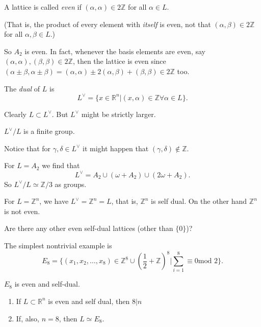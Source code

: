 \begin{definition}
\label{definition-even-lattice}
A lattice is called {\it even} if $(\alpha,\alpha)\in 2 \mathbb{Z}$ 
for all $\alpha \in L$.
\end{definition}

\noindent
(That is, the product of every element with {\it itself} is even,
not that $(\alpha,\beta)\in 2 \mathbb{Z}$ for all $\alpha,\beta \in L$.)

So $A_2$ is even. In fact, whenever the basis elements
are even, say $(\alpha,\alpha),(\beta,\beta)\in 2\mathbb{Z}$,
then the lattice is even since
$(\alpha \pm \beta,\alpha \pm \beta)=(\alpha,\alpha)
\pm 2(\alpha,\beta)+(\beta,\beta) \in 2\mathbb{Z}$ too.

\begin{definition}
\label{definition-dual-lattice}
The {\it dual} of $L$ is 
$$
L^\vee=\{ x \in \mathbb{R}^n|(x,\alpha) \in \mathbb{Z}\forall \alpha \in L\}.
$$
\end{definition}

\noindent
Clearly $L \subset L^\vee$.
But $L^\vee$ might be strictly larger.

\begin{exercise}
\label{exercise-discriminant}
$L^\vee/L$ is a finite group.
\end{exercise}

\noindent
Notice that for  $\gamma,\delta \in L^\vee$
it might happen that $(\gamma,\delta) \not\in \mathbb{Z}$.

For $L=A_2$ we find that
$$
L^\vee = A_2 \cup (\omega+A_2) \cup  (2\omega + A_2).
$$
So $L^\vee/L \simeq \mathbb{Z}/3$ as groups.

For $L = \mathbb{Z}^n$, we have $L^\vee=\mathbb{Z}^n=L$, that is,
$\mathbb{Z}^n$ is self dual.
On the other hand $\mathbb{Z}^n$ is not even.

Are there any other even self-dual lattices
(other than $\{0\}$)?

The simplest nontrivial example is
$$
E_8=\{(x_1,x_2,\ldots,x_8) \in \mathbb{Z}^8 \cup (\frac{1}{2}+\mathbb{Z})^8|
\sum_{i=1}^8 \equiv 0 \text{mod }2\}.
$$

\begin{lemma}
\label{lemma-e8}
$E_8$ is even and self-dual.
\end{lemma}

\begin{theorem}
\label{theorem-self-dual-lattices}
\begin{enumerate}
\item If $L \subset \mathbb{R}^n$ is even and self dual,
then $8|n$

\item If, also, $n=8$, then $L \simeq E_8$.
\end{enumerate}
\end{theorem}

